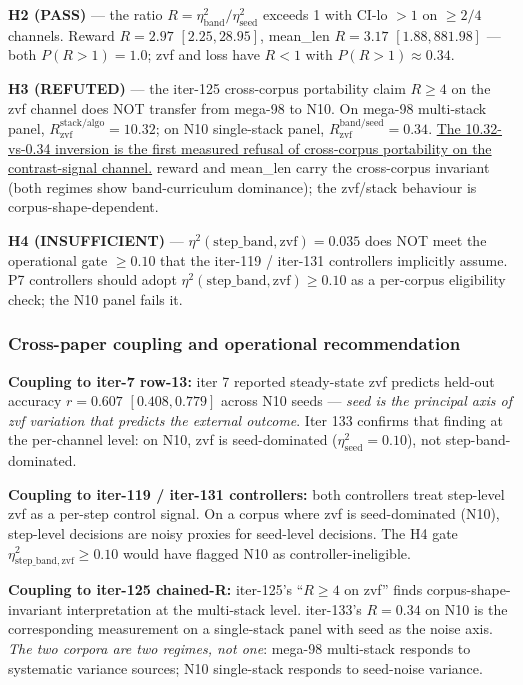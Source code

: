\documentclass{article}  \usepackage[preprint,nonatbib]{neurips_2026} \usepackage[numbers]{natbib}
\begin{document}
\textbf{H2 (PASS)} --- the ratio $R = \eta^2_{\mathrm{band}} / \eta^2_{\mathrm{seed}}$
exceeds 1 with CI-lo $>1$ on $\geq 2/4$ channels. Reward $R=2.97$
$[2.25, 28.95]$, mean\_len $R=3.17$ $[1.88, 881.98]$ --- both
$P(R>1)=1.0$; zvf and loss have $R<1$ with $P(R>1)\approx 0.34$.

\textbf{H3 (REFUTED)} --- the iter-125 cross-corpus portability claim
$R \geq 4$ on the zvf channel does NOT transfer from mega-98 to N10.
On mega-98 multi-stack panel, $R_{\mathrm{zvf}}^{\mathrm{stack/algo}}=10.32$;
on N10 single-stack panel, $R_{\mathrm{zvf}}^{\mathrm{band/seed}}=0.34$.
\underline{The 10.32-vs-0.34 inversion is the first measured refusal of
cross-corpus portability on the contrast-signal channel.} reward and
mean\_len carry the cross-corpus invariant (both regimes show band-curriculum
dominance); the zvf/stack behaviour is corpus-shape-dependent.

\textbf{H4 (INSUFFICIENT)} --- $\eta^2(\mathrm{step\_band}, \mathrm{zvf}) = 0.035$
does NOT meet the operational gate $\geq 0.10$ that the iter-119 / iter-131
controllers implicitly assume. P7 controllers should adopt
$\eta^2(\mathrm{step\_band}, \mathrm{zvf}) \geq 0.10$ as a per-corpus
eligibility check; the N10 panel fails it.

\subsubsection{Cross-paper coupling and operational recommendation}
\label{sec:p5-iter133-coupling}

\textbf{Coupling to iter-7 row-13:} iter 7 reported steady-state zvf predicts
held-out accuracy $r=0.607$ $[0.408, 0.779]$ across N10 seeds --- \emph{seed
is the principal axis of zvf variation that predicts the external outcome}.
Iter 133 confirms that finding at the per-channel level: on N10, zvf is
seed-dominated ($\eta^2_{\mathrm{seed}}=0.10$), not step-band-dominated.

\textbf{Coupling to iter-119 / iter-131 controllers:} both controllers treat
step-level zvf as a per-step control signal. On a corpus where zvf is
seed-dominated (N10), step-level decisions are noisy proxies for
seed-level decisions. The H4 gate
$\eta^2_{\mathrm{step\_band}, \mathrm{zvf}} \geq 0.10$ would have flagged
N10 as controller-ineligible.

\textbf{Coupling to iter-125 chained-R:} iter-125's ``$R \geq 4$ on zvf''
finds corpus-shape-invariant interpretation at the multi-stack level.
iter-133's $R=0.34$ on N10 is the corresponding measurement on a
single-stack panel with seed as the noise axis. \emph{The two corpora
are two regimes, not one}: mega-98 multi-stack responds to systematic
variance sources; N10 single-stack responds to seed-noise variance.
\end{document}
